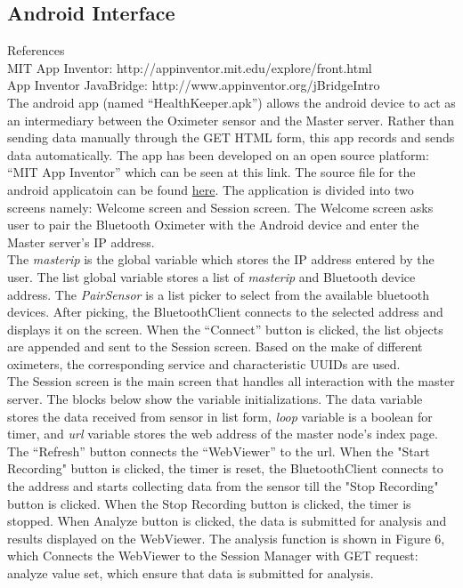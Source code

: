 \documentclass[10pt,journal,compsoc]{IEEEtran}
\begin{document}
\subsection{Android Interface}
References \\
MIT App Inventor: http://appinventor.mit.edu/explore/front.html \\
App Inventor JavaBridge: http://www.appinventor.org/jBridgeIntro \\
The android app (named “HealthKeeper.apk”) allows the android device to act as an intermediary between the Oximeter sensor and the Master server. Rather than sending data manually through the GET HTML form, this app records and sends data automatically. The app has been developed on an open source platform: “MIT App Inventor” which can be seen at this link. The source file for the android applicatoin can be found \href{https://drive.google.com/open?id=1rPIf_NHuBXp6peUX3vkzqJg5hfht3KDC}{here}. The application is divided into two screens namely: Welcome screen and Session screen. The Welcome screen asks user to pair the Bluetooth Oximeter with the Android device and enter the Master server’s IP address. \\
The \textit{masterip} is the global variable which stores the IP address entered by the user. The list global variable stores a list of \textit{masterip} and Bluetooth device address. The \textit{PairSensor} is a list picker to select from the available bluetooth devices. After picking, the BluetoothClient connects to the selected address and displays it on the screen. When the “Connect” button is clicked, the list objects are appended and sent to the Session screen. Based on the make of different oximeters, the corresponding service and characteristic UUIDs are used. \\
The Session screen is the main screen that handles all interaction with the master server. The blocks below show the variable initializations. The data variable stores the data received from sensor in list form, \textit{loop} variable is a boolean for timer, and \textit{url} variable stores the web address of the master node’s index page.\\
The “Refresh” button connects the “WebViewer” to the url. When the "Start Recording" button is clicked, the timer is reset, the BluetoothClient connects to the address and starts collecting data from the sensor till the "Stop Recording" button is clicked. When the Stop Recording button is clicked, the timer is stopped. When Analyze button is clicked, the data is submitted for analysis and results displayed on the WebViewer. The analysis function is shown in Figure 6, which Connects the WebViewer to the Session Manager with GET request: analyze value set, which ensure that data is submitted for analysis.
\end{document}
